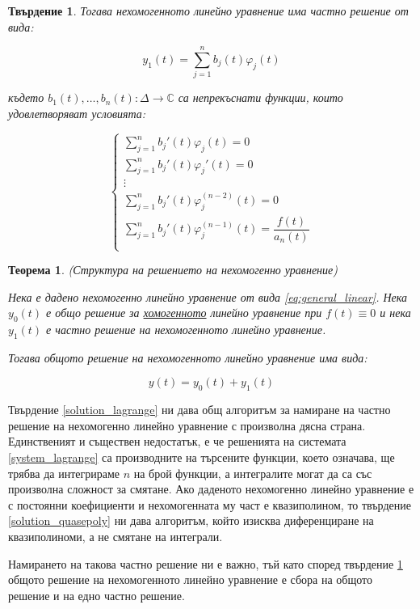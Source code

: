 \documentclass{scrartcl}
\newtheorem{theorem}{Теорема}
\newtheorem{statement}{Твърдение}
\begin{document}
\begin{FlushLeft}
\begin{statement}
Тогава нехомогенното линейно уравнение има частно решение от вида:

$$y_1(t) = \sum_{j=1}^n b_j(t) \varphi_j(t)$$

където $b_1(t), \dots, b_n(t) : \Delta \rightarrow \mathbb{C}$ са непрекъснати функции, които удовлетворяват условията:

\begin{equation}\label{system_lagrange}
\begin{cases}
    \displaystyle\sum_{j=1}^n b_j'(t)\varphi_j(t) = 0\\
    \displaystyle\sum_{j=1}^n b_j'(t)\varphi_j'(t) = 0\\
    \vdots\\
    \displaystyle\sum_{j=1}^n b_j'(t)\varphi_j^{(n-2)}(t) = 0\\
    \displaystyle\sum_{j=1}^n b_j'(t)\varphi_j^{(n-1)}(t) = \dfrac{f(t)}{a_n(t)}\\
\end{cases}
\end{equation}
\end{statement}

\begin{theorem}\label{structure_of_sol}
(Структура на решението на нехомогенно уравнение)

Нека е дадено нехомогенно линейно уравнение от вида \eqref{eq:general_linear}.
Нека $y_0(t)$ е общо решение за \underline{хомогенното} линейно уравнение при $f(t) \equiv 0$ и нека $y_1(t)$ е частно решение на нехомогенното линейно уравнение.

Тогава общото решение на нехомогенното линейно уравнение има вида:

$$y(t) = y_0(t) + y_1(t)$$    
\end{theorem}

Твърдение \ref{solution_lagrange} ни дава общ алгоритъм за намиране на частно решение на нехомогенно линейно уравнение с произволна дясна страна. Единственият и съществен недостатък, е че решенията на системата \eqref{system_lagrange} са производните на търсените функции, което означава, ще трябва да интегрираме $n$ на брой функции, а интегралите могат да са със произволна сложност за смятане. Ако даденото нехомогенно линейно уравнение е с постоянни коефициенти и нехомогенната му част е квазиполином, то твърдение \ref{solution_quasepoly} ни дава алгоритъм, който изисква диференциране на квазиполиноми, а не смятане на интеграли.

Намирането на такова частно решение ни е важно, тъй като според твърдение \ref{structure_of_sol} общото решение на нехомогенното линейно уравнение е сбора на общото решение и на едно частно решение.


\end{FlushLeft}
\end{document}
